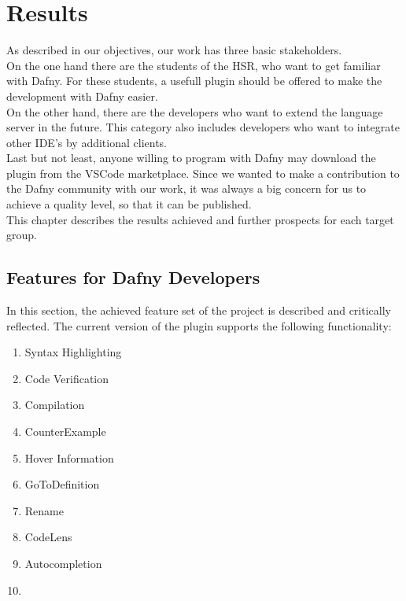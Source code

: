 \section{Results}
\label{section:results}


As described in our objectives, our work has three basic stakeholders. \\

On the one hand there are the students of the HSR, who want to get familiar with Dafny.
For these students, a usefull plugin should be offered to make the development with Dafny easier. \\

On the other hand, there are the developers who want to extend the language server in the future.
This category also includes developers who want to integrate other IDE's by additional clients.\\

Last but not least, anyone willing to program with Dafny may download the plugin from the VSCode marketplace.
Since we wanted to make a contribution to the Dafny community with our work,
it was always a big concern for us to achieve a quality level, so that it can be published.\\

This chapter describes the results achieved and further prospects for each target group.

\subsection{Features for Dafny Developers}
In this section, the achieved feature set of the project is described and critically reflected.
The current version of the plugin supports the following functionality:
\begin{enumerate}
    \item Syntax Highlighting
    \item Code Verification
    \item Compilation
    \item CounterExample
    \item Hover Information
    \item GoToDefinition
    \item Rename
    \item CodeLens
    \item Autocompletion
    \item  {}
\end{enumerate}


